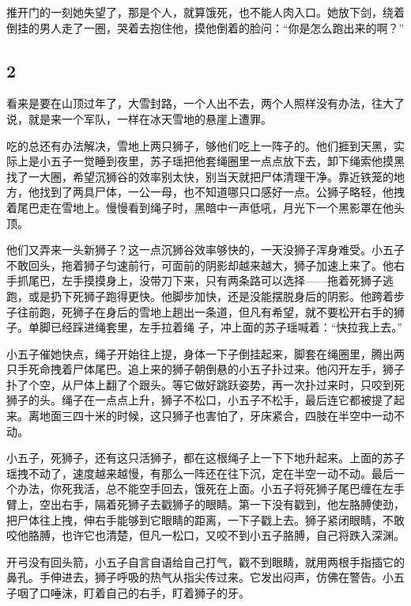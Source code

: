 推开门的一刻她失望了，那是个人，就算饿死，也不能人肉入口。她放下剑，绕着倒挂的男人走了一圈，哭着去抱住他，摸他倒着的脸问：“你是怎么跑出来的啊？”
\newline

{\centering\subsection{2}}

看来是要在山顶过年了，大雪封路，一个人出不去，两个人照样没有办法，往大了说，就是来一个军队，一样在冰天雪地的悬崖上遭罪。

吃的总还有办法解决，雪地上两只狮子，够他们吃上一阵子的。他们捱到天黑，实际上是小五子一觉睡到夜里，苏子瑶把他套绳圈里一点点放下去，卸下绳索他摸黑找了一大圈，希望沉狮谷的效率别太快，别当天就把尸体清理干净。靠近铁笼的地方，他找到了两具尸体，一公一母，也不知道哪只口感好一点。公狮子略轻，他拽着尾巴走在雪地上。慢慢看到绳子时，黑暗中一声低吼，月光下一个黑影罩在他头顶。

他们又弄来一头新狮子？这一点沉狮谷效率够快的，一天没狮子浑身难受。小五子不敢回头，拖着狮子匀速前行，可面前的阴影却越来越大，狮子加速上来了。他右手抓尾巴，左手摸摸身上，没带刀下来，只有两条路可以选择——拖着死狮子逃跑，或是扔下死狮子跑得更快。他脚步加快，还是没能摆脱身后的阴影。他跨着步子往前跑，死狮子在身后的雪地上趟出一条道，但凡有希望，就不要松开右手的狮子。单脚已经踩进绳套里，左手拉着绳
子，冲上面的苏子瑶喊着：“快拉我上去。”

小五子催她快点，绳子开始往上提，身体一下子倒挂起来，脚套在绳圈里，腾出两只手死命拽着尸体尾巴。追上来的狮子朝倒悬的小五子扑过来。他闪开左手，狮子扑了个空，从尸体上翻了个跟头。等它做好跳跃姿势，再一次扑过来时，只咬到死狮子的头。绳子在一点点上升，狮子不松口，小五子不松手，最后连它都被提了起来。离地面三四十米的时候，这只狮子也害怕了，牙床紧合，四肢在半空中一动不动。

小五子，死狮子，还有这只活狮子，都在这根绳子上一下下地升起来。上面的苏子瑶拽不动了，速度越来越慢，有那么一阵还在往下沉，定在半空一动不动。最后一个办法，你死我活，总不能空手回去，饿死在上面。小五子将死狮子尾巴缠在左手臂上，空出右手，隔着死狮子去戳狮子的眼睛。第一下没有戳到，他左胳膊使劲，把尸体往上拽，伸右手能够到它眼睛的距离，一下子戳上去。狮子紧闭眼睛，不敢咬他胳膊，也许它也清楚，但凡一松口，又咬不到小五子胳膊，自己将跌入深渊。

开弓没有回头箭，小五子自言自语给自己打气，戳不到眼睛，就用两根手指插它的鼻孔。手伸进去，狮子呼吸的热气从指尖传过来。它发出闷声，仿佛在警告。小五子咽了口唾沫，盯着自己的右手，盯着狮子的牙。


